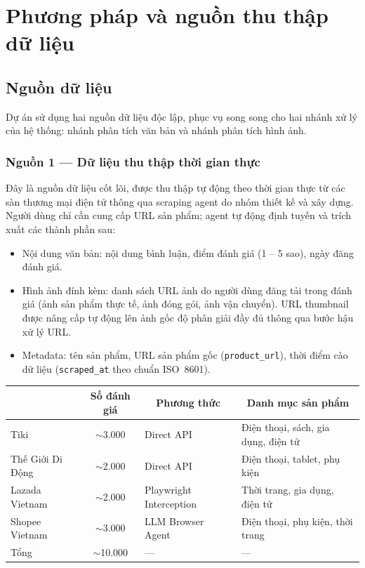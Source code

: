 \section{Phương pháp và nguồn thu thập dữ liệu}

\subsection{Nguồn dữ liệu}

Dự án sử dụng hai nguồn dữ liệu độc lập, phục vụ song song cho hai nhánh xử lý của hệ thống: nhánh phân tích văn bản và nhánh phân tích hình ảnh.

\subsubsection{Nguồn 1 --- Dữ liệu thu thập thời gian thực}

Đây là nguồn dữ liệu cốt lõi, được thu thập tự động theo thời gian thực từ các sàn thương mại điện tử thông qua scraping agent do nhóm thiết kế và xây dựng. Người dùng chỉ cần cung cấp URL sản phẩm; agent tự động định tuyến và trích xuất các thành phần sau:

\begin{itemize}[labelsep=10pt, leftmargin=2cm]
    \item Nội dung văn bản: nội dung bình luận, điểm đánh giá (1 -- 5 sao), ngày đăng đánh giá.
    \item Hình ảnh đính kèm: danh sách URL ảnh do người dùng đăng tải trong đánh giá (ảnh sản phẩm thực tế, ảnh đóng gói, ảnh vận chuyển). URL thumbnail được nâng cấp tự động lên ảnh gốc độ phân giải đầy đủ thông qua bước hậu xử lý URL.
    \item Metadata: tên sản phẩm, URL sản phẩm gốc (\texttt{product\_url}), thời điểm cào dữ liệu (\texttt{scraped\_at} theo chuẩn ISO~8601).
\end{itemize}

\begin{center}
\renewcommand{\arraystretch}{1.4}
\begin{tabularx}{\textwidth}{|l|c|l|X|}
\hline
\rowcolor[HTML]{E8E8E8}
\multicolumn{1}{|c|}{\textbf{Nền tảng}} &
\multicolumn{1}{c|}{\textbf{Số đánh giá}} &
\multicolumn{1}{c|}{\textbf{Phương thức}} &
\multicolumn{1}{c|}{\textbf{Danh mục sản phẩm}} \\
\hline
Tiki & $\sim$3.000 & Direct API & Điện thoại, sách, gia dụng, điện tử \\
\hline
Thế Giới Di Động & $\sim$2.000 & Direct API & Điện thoại, tablet, phụ kiện \\
\hline
Lazada Vietnam & $\sim$2.000 & Playwright Interception & Thời trang, gia dụng, điện tử \\
\hline
Shopee Vietnam & $\sim$3.000 & LLM Browser Agent & Điện thoại, phụ kiện, thời trang \\
\hline
Tổng & $\sim$10.000 & --- & --- \\
\hline
\end{tabularx}
\end{center}

